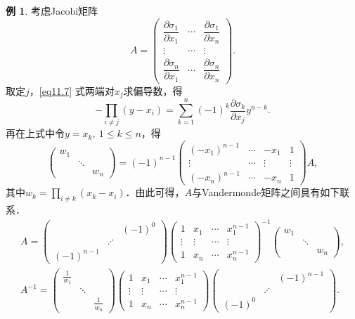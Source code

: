 \documentclass[a4paper,fontset=windows]{ctexbook}
\theoremstyle{definition}
\newtheorem{example}{例}[chapter]
\renewcommand{\le}{\leqslant}
\begin{document}
\begin{example}\label{ex11.13}
考虑Jacobi矩阵
$$A=\begin{pmatrix}\dfrac{\partial\sigma_1}{\partial x_1}&\cdots&\dfrac{\partial\sigma_1}{\partial x_n} \\ \vdots&\cdots&\vdots \\ \dfrac{\partial\sigma_n}{\partial x_1}&\cdots&\dfrac{\partial\sigma_n}{\partial x_n}\end{pmatrix}.$$
取定$j$，\eqref{eq11.7} 式两端对$x_j$求偏导数，得
$$-\prod_{i\ne j}(y-x_i)=\sum_{k=1}^n(-1)^k\frac{\partial\sigma_k}{\partial x_j}y^{n-k}.$$
再在上式中令$y=x_k,~1\le k\le n$，得
$$\begin{pmatrix}w_1&& \\ &\ddots& \\ &&w_n\end{pmatrix}=(-1)^{n-1}\begin{pmatrix}(-x_1)^{n-1}&\cdots&-x_1&1 \\ \vdots&\cdots&\vdots&\vdots \\ (-x_n)^{n-1}&\cdots&-x_n&1\end{pmatrix}A,$$
其中$w_k=\prod\limits_{i\ne k}(x_k-x_i)$．由此可得，$A$与Vandermonde矩阵之间具有如下联系．
$$\begin{array}{l}
A=\begin{pmatrix}&&(-1)^0 \\ &\iddots& \\ (-1)^{n-1}&&\end{pmatrix}\begin{pmatrix}1&x_1&\cdots&x_1^{n-1} \\ \vdots&\vdots&\cdots&\vdots \\ 1&x_n&\cdots&x_n^{n-1}\end{pmatrix}^{-1}\begin{pmatrix}w_1&& \\ &\ddots& \\ &&w_n\end{pmatrix}, \\
A^{-1}=\begin{pmatrix}\frac{1}{w_1}&& \\ &\ddots& \\ &&\frac{1}{w_n}\end{pmatrix}\begin{pmatrix}1&x_1&\cdots&x_1^{n-1} \\ \vdots&\vdots&\cdots&\vdots \\ 1&x_n&\cdots&x_n^{n-1}\end{pmatrix}\begin{pmatrix}&&(-1)^{n-1} \\ &\iddots& \\ (-1)^0&&\end{pmatrix}.
\end{array}$$
\end{example}
\end{document}
